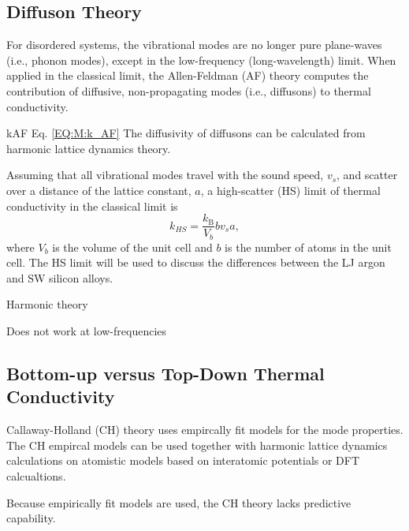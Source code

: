 \subsection{Diffuson Theory}

For disordered systems, the vibrational modes are no 
longer pure plane-waves (i.e., phonon modes), except in the low-frequency 
(long-wavelength) limit. When applied in the classical limit, 
the Allen-Feldman (AF) theory computes 
the contribution of diffusive, non-propagating modes (i.e., diffusons) 
to thermal conductivity.\cite{allen_thermal_1993} 

kAF Eq. \eqref{EQ:M:k_AF} 
The diffusivity of diffusons 
can be calculated from harmonic lattice dynamics theory.
\cite{allen_thermal_1993,feldman_thermal_1993,feldman_numerical_1999} 

Assuming that all vibrational modes travel with the sound speed, $v_s$, and 
scatter over a distance of the lattice constant, $a$, 
a high-scatter (HS) limit of thermal conductivity in the classical 
limit is\cite{cahill_lattice_1988} 
\begin{equation}\label{EQ:M:k_AF,HS}
k_{HS} = \frac{k_{\text{B}}}{V_b}b v_s a,
\end{equation}
where $V_b$ is the volume of the unit cell and $b$ is the number of atoms 
in the unit cell. The HS limit will be used to 
discuss the differences between the LJ argon and SW silicon alloys. 

Harmonic theory

Does not work at low-frequencies

\subsection{Bottom-up versus Top-Down Thermal Conductivity}

Callaway-Holland (CH) theory uses empircally fit models for the 
mode properties. The CH empircal models can be used together 
with harmonic lattice dynamics calculations on atomistic 
models based on interatomic potentials or DFT calcualtions. 

Because empirically fit models are used, the CH theory lacks 
predictive capability. 

